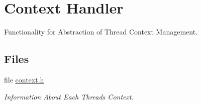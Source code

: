 \hypertarget{group__RTEMSScoreContext}{}\section{Context Handler}
\label{group__RTEMSScoreContext}


Functionality for Abstraction of Thread Context Management.  


\subsection*{Files}
\begin{DoxyCompactItemize}
\item 
file \mbox{\hyperlink{context_8h}{context.\+h}}
\begin{DoxyCompactList}\small\item\em Information About Each Thread\textquotesingle{}s Context. \end{DoxyCompactList}\end{DoxyCompactItemize}
